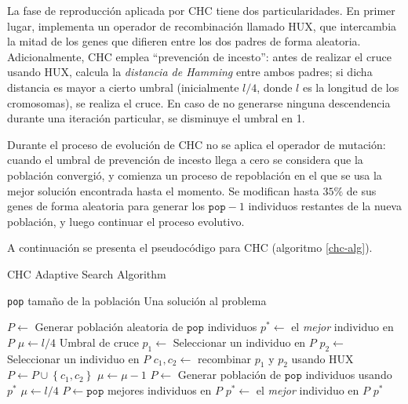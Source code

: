 La fase de reproducción aplicada por CHC tiene dos particularidades. En primer lugar, implementa un operador de recombinación llamado HUX, que intercambia la mitad de los genes que difieren entre los dos padres de forma aleatoria. Adicionalmente, CHC emplea ``prevención de incesto'': antes de realizar el cruce usando HUX, calcula la \emph{distancia de Hamming} entre ambos padres; si dicha distancia es mayor a cierto umbral (inicialmente $l/4$, donde $l$ es la longitud de los cromosomas), se realiza el cruce. En caso de no generarse ninguna descendencia durante una iteración particular, se disminuye el umbral en 1.

Durante el proceso de evolución de CHC no se aplica el operador de mutación: cuando el umbral de prevención de incesto llega a cero se considera que la población convergió, y comienza un proceso de repoblación en el que se usa la mejor solución encontrada hasta el momento. Se modifican hasta $35\%$ de sus genes de forma aleatoria para generar los $\texttt{pop}-1$ individuos restantes de la nueva población, y luego continuar el proceso evolutivo.

A continuación se presenta el pseudocódigo para CHC (algoritmo \ref{chc-alg}).

\begin{algorithm}
\caption{CHC Adaptive Search Algorithm}
\label{chc-alg}
\begin{algorithmic}[1]

\Require \texttt{pop} tamaño de la población
\Ensure Una solución al problema

\State $P \gets$ Generar población aleatoria de $\texttt{pop}$ individuos
\State $p^{*} \gets $ el \emph{mejor} individuo en $P$
\State $\mu \gets l/4$ \Comment Umbral de cruce
		\State $p_1 \gets$ Seleccionar un individuo en $P$
		\State $p_2 \gets$ Seleccionar un individuo en $P$
			\State $c_1, c_2 \gets $ recombinar $p_1$ y $p_2$ usando HUX
			\State $P \gets P \cup \left\lbrace c_1, c_2 \right\rbrace$
		\EndIf
	\EndFor
		\State $\mu \gets \mu-1$
			\State $P \gets$ Generar población de $\texttt{pop}$ individuos usando $p^*$
			\State $\mu \gets l/4$
		\EndIf
	\Else
		\State $P \gets \texttt{pop}$ mejores individuos en $P$
			\State $p^{*} \gets$ el \emph{mejor} individuo en $P$
		\EndIf
	\EndIf
\EndWhile
\State \Return $p^{*}$

\end{algorithmic}
\end{algorithm}

